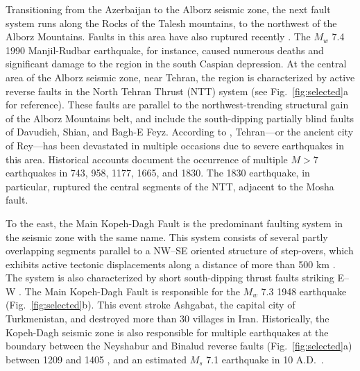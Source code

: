 Transitioning from the Azerbaijan to the Alborz seismic zone, the next fault system runs along the Rocks of the Talesh mountains, to the northwest of the Alborz Mountains. Faults in this area have also ruptured recently \citep{Berberian1999}. The $M_w$ 7.4 1990 Manjil-Rudbar earthquake, for instance, caused numerous deaths and significant damage to the region in the south Caspian depression. At the central area of the Alborz seismic zone, near Tehran, the region is characterized by active reverse faults in the North Tehran Thrust (NTT) system (see Fig.~\ref{fig:selected}a for reference). These faults are parallel to the northwest-trending structural gain of the Alborz Mountains belt, and include the south-dipping partially blind faults of Davudieh, Shian, and Bagh-E Feyz. According to \citet{Ambraseys2005}, Tehran---or the ancient city of Rey---has been devastated in multiple occasions due to severe earthquakes in this area. Historical accounts document the occurrence of multiple $M>7$ earthquakes in 743, 958, 1177, 1665, and 1830. The 1830 earthquake, in particular, ruptured the central segments of the NTT, adjacent to the Mosha fault.

To the east, the Main Kopeh-Dagh Fault is the predominant faulting system in the seismic zone with the same name. This system consists of several partly overlapping segments parallel to a NW--SE oriented structure of step-overs, which exhibits active tectonic displacements along a distance of more than 500 km \citep{Trifonov1978}. The system is also characterized by short south-dipping thrust faults striking E--W \citep{Berberian2001}. The Main Kopeh-Dagh Fault is responsible for the $M_w$ 7.3 1948 earthquake (Fig.~\ref{fig:selected}b). This event stroke Ashgabat, the capital city of Turkmenistan, and destroyed more than 30 villages in Iran. Historically, the Kopeh-Dagh seismic zone is also responsible for multiple earthquakes at the boundary between the Neyshabur and Binalud reverse faults (Fig.~\ref{fig:selected}a) between 1209 and 1405 \citep{Berberian1999}, and an estimated $M_s$ 7.1 earthquake in 10 A.D.~\citep{Berberian2001}.




